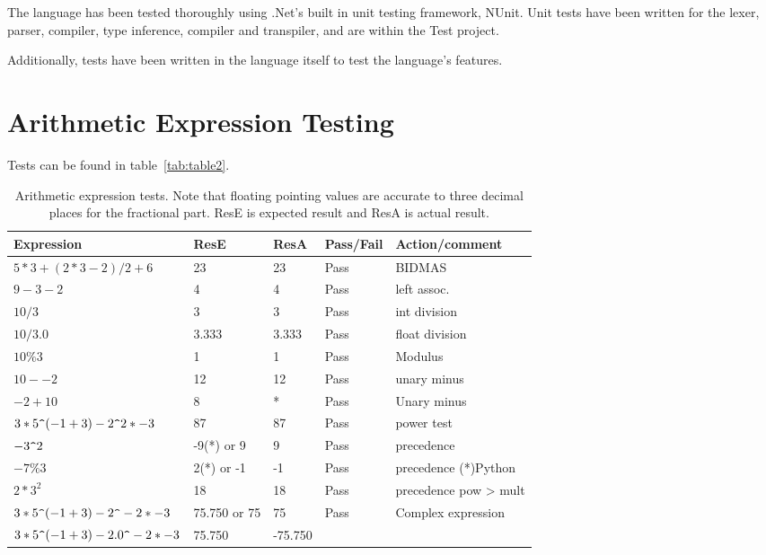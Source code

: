 The language has been tested thoroughly using .Net's built in unit testing framework, NUnit.
Unit tests have been written for the lexer, parser, compiler, type inference, compiler and transpiler, and are 
within the Test project.

Additionally, tests have been written in the language itself to test the language's features.

\section{Arithmetic Expression Testing}\label{sec:arithmetic-expression-testing}

Tests can be found in table~\ref{tab:table2}.

\begin{table}[h]
    \caption{Arithmetic expression tests. Note that floating pointing values are accurate to three decimal places for the fractional part. ResE is expected result and ResA is actual result. \\}
    \begin{tabular}{|p{1.8in}|p{0.5in}|p{0.4in}|p{0.6in}|p{1.4in}|} \hline
    Expression & ResE & ResA& Pass/Fail & Action/comment \\ \hline \hline
    $5*3+(2*3-2)/2+6$ & 23 & 23 & Pass & BIDMAS \\ \hline
    $9-3-2$ & 4 & 4 & Pass & left assoc.\  \\ \hline
    $10 / 3$ & 3 & 3 & Pass & int division  \\ \hline
    $10 / 3.0$ & 3.333 & 3.333 & Pass & float division \\ \hline
    $10\%3$ & 1 & 1 & Pass & Modulus \\ \hline
    $10 - -2$ & 12 & 12 & Pass & unary minus\\ \hline
    $-2 + 10$ & 8 & * & Pass & Unary minus \\ \hline
    $3*5\verb|^|(-1+3)-2\verb|^|2*-3$ & 87 & 87 & Pass & power test \\ \hline
    $-3\verb|^|2$ & -9(*) or 9 & 9 & Pass & precedence \\ \hline
    $-7\%3$ & 2(*) or -1 & -1 & Pass & precedence (*)Python\\ \hline
    $2*3^2$ & 18 & 18 & Pass & precedence pow > mult \\ \hline
    $3*5\verb|^|(-1+3)-2\verb|^|-2*-3$ & 75.750 or 75 & 75 & Pass & Complex expression \\ \hline
    $3*5\verb|^|(-1+3)-2.0\verb|^|-2*-3$ & 75.750 & -75.750 & & \\ \hline

\end{tabular}
\end{table}
